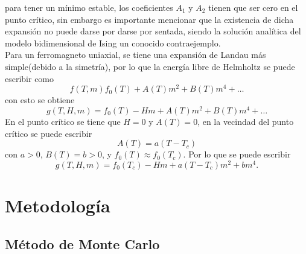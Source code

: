 \documentclass[a4paper]{article}
\begin{document}
para tener un mínimo estable, los coeficientes $A_1$ y $A_2$ tienen que ser cero en el punto crítico, sin embargo es importante mencionar que la existencia de dicha expansión no puede darse por darse por sentada, siendo la solución analítica del modelo bidimensional de Ising un conocido contraejemplo.\\
Para un ferromagneto uniaxial, se tiene una expansión de Landau más simple(debido a la simetría), por lo que la energía libre de Helmholtz se puede escribir como
\begin{equation}
f(T,m)f_0(T)+A(T)m^2+B(T)m^4+\hdots
\end{equation}
con esto se obtiene
\begin{equation}
g(T,H,m)=f_0(T)-H m+A(T)m^2+B(T)m^4+\hdots
\end{equation}
En el punto crítico se tiene que $H=0$ y $A(T)=0$, en la vecindad del punto crítico se puede escribir
\begin{equation}
A(T)=a(T-T_c)
\end{equation}
con $a>0$, $B(T)=b>0$, y $f_0(T)\approx f_0 (T_c)$. Por lo que se puede escribir
\begin{equation}
g(T,H,m)=f_0(T_c)-H m+a(T-T_c)m^2+b m^4.
\end{equation}

\section{Metodología}
\subsection{Método de Monte Carlo}
\end{document}

